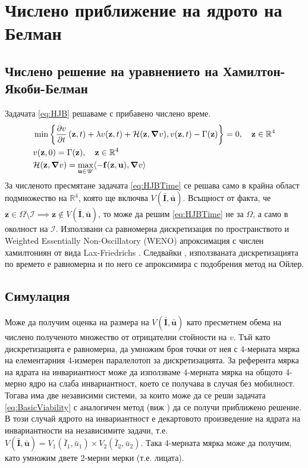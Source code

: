 \section{\hspace{1em} Числено приближение на ядрото на Белман}
\subsection{Числено решение на уравнението на Хамилтон-Якоби-Белман}
Задачата \eqref{eq:HJB} решаваме с прибавено числено време.
\begin{equation}
  \label{eq:HJBTime}
  \begin{split}
    &\min\left\{\pdv{v}{t}\left(\mathbf{z}, t\right) + \lambda v(\mathbf{z}, t) + \mathcal{H}(\mathbf{z}, \grad{v}), v(\mathbf{z}, t) - \Gamma(\mathbf{z})\right\} = 0, \quad \mathbf{z} \in \mathbb{R}^4 \\
    &v(\mathbf{z}, 0) = \Gamma(\mathbf{z}), \quad \mathbf{z} \in \mathbb{R}^4 \\
    &\mathcal{H}(\mathbf{z}, \grad{v}) = \max_{\mathbf{u} \in \mathscr{U}} \langle -\mathbf{f}(\mathbf{z}, \mathbf{u}), \grad{v} \rangle
  \end{split}
\end{equation}
За численото пресмятане задачата \eqref{eq:HJBTime} се решава само в крайна област подмножество на $\mathbb{R}^4$, която ще включва $V(\bar{\mathbf{I}}, \bar{\mathbf{u}})$.
Всъщност от факта, че $\mathbf{z} \in \Omega \setminus \mathscr{I} \implies \mathbf{z} \notin V(\bar{\mathbf{I}}, \bar{\mathbf{u}})$, то може да решим \eqref{eq:HJBTime} не за $\Omega$, а само в околност на $\mathscr{I}$.
Използвани са равномерна дискретизация по пространството и Weighted Essentially Non-Oscillatory (WENO) \cite[глава~3.4]{Osher2003} апроксимация с числен хамилтониян от вида Lax-Friedrichs \cite[глава~5.3]{Osher2003}.
Следвайки \cite[глава~3.5]{Osher2003}, използваната дискретизацията по времето е равномерна и по него се апроксимира с подобрения метод на Ойлер.

\subsection{Симулация}
Може да получим оценка на размера на $V(\bar{\mathbf{I}}, \bar{\mathbf{u}})$ като пресметнем обема на числено полученото множество от отрицателни стойности на $v$.
Тъй като дискретизацията е равномерна, да умножим броя точки от нея с 4-мерната мярка на елементарния 4-измерен паралелотоп за дискретизацията.
За референта мярка на ядрата на инвариантност може да използваме 4-мерната мярка на общото 4-мерно ядро на слаба инвариантност, което се получава в случая без мобилност.
Тогава има две независими системи, за които може да се реши задачата \eqref{eq:BasicViability} с аналогичен метод (виж \cite{Rashkov2022}) да се получи приближено решение.
В този случай ядрото на инвариантност е декартовото произведение на ядрата на инвариантности на независимите задачи, т.е. $V(\bar{\mathbf{I}}, \bar{\mathbf{u}}) = V_1(\bar{I}_1, \bar{u}_1) \times V_2(\bar{I}_2, \bar{u}_2)$.
Така 4-мерната мярка може да получим, като умножим двете 2-мерни мерки (т.е. лицата).


